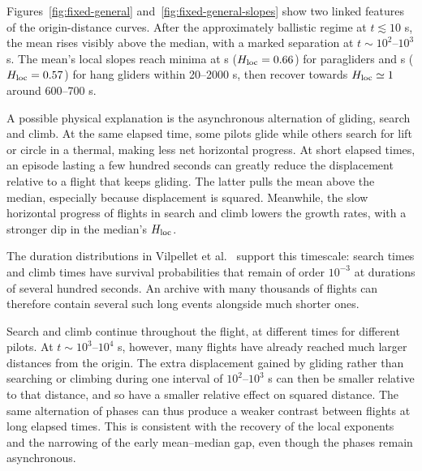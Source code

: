 Figures~\ref{fig:fixed-general} and~\ref{fig:fixed-general-slopes} show two linked
features of the origin-distance curves. After the approximately ballistic regime
at $t\lesssim10$ s, the mean rises visibly above the median, with a marked
separation at $t\sim10^2$--$10^3$ s. The mean's local slopes reach minima at \ChThreeParaLocalMinLag{} s
($H_{\rm loc}=0.66$) for paragliders and \ChThreeHangLocalMinLag{} s
($H_{\rm loc}=0.57$) for hang gliders within 20--2000 s, then recover
towards $H_{\rm loc}\simeq1$ around 600--700 s.


A possible physical explanation is the asynchronous alternation of gliding,
search and climb. At the same elapsed time, some pilots glide while others search
for lift or circle in a thermal, making less net horizontal progress. At short
elapsed times, an episode lasting a few hundred seconds can greatly reduce the
displacement relative to a flight that keeps gliding. The latter pulls the mean
above the median, especially because displacement is squared. Meanwhile, the
slow horizontal progress of flights in search and climb lowers the growth rates,
with a stronger dip in the median's $H_{\rm loc}$.

The duration distributions in Vilpellet et al.~\cite[Fig.~4f,i]{vilpellet2026}
support this timescale: search times and climb times have survival probabilities that remain of order $10^{-3}$ at
durations of several hundred seconds. An archive with many thousands of flights
can therefore contain several such long events alongside much shorter ones.

Search and climb continue throughout the flight, at different times for different
pilots. At $t\sim10^3$--$10^4$ s, however, many flights have already reached much
larger distances from the origin. The extra displacement gained by gliding rather
than searching or climbing during one interval of $10^2$--$10^3$ s can then be
smaller relative to that distance, and so have a smaller relative effect on
squared distance. The same alternation of phases can thus produce a weaker contrast between
flights at long elapsed times. This is consistent with the recovery of the local
exponents and the narrowing of the early mean--median gap, even though the phases
remain asynchronous.


